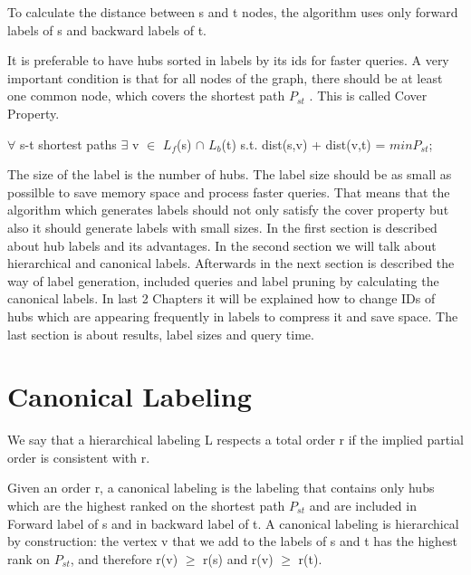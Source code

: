 \documentclass[english,draft]{article}
\begin{document}
To calculate the distance between s and t nodes, the algorithm uses only forward labels of s and backward labels of t. 

It is preferable to have hubs sorted in labels by its ids for faster queries.
A very important condition is that for all nodes of the graph, there should be at least one common node, which covers the shortest path ${P}_{st}$ . This is called Cover Property. 

\begin{center}
			$\forall$ s-t shortest paths 
			$\exists$ v $\in$ ${L}_{f}$(s) $\cap$ ${L}_{b}$(t) 
			  s.t. dist(s,v) + dist(v,t) = $min {P}_{st}$;
\end{center}
The size of the label is the number of hubs. 
The label size should be as small as possilble to save memory space and process faster queries. 
That means that the algorithm which generates labels should not only satisfy the cover property but also it should
generate labels with small sizes.
In the first section is described about hub labels and its advantages. 
In the second section we will talk about hierarchical and canonical labels. 
Afterwards in the next section is described the way of label generation, included queries and label pruning by
calculating the canonical labels. 
In last 2 Chapters it will be explained how to change IDs of hubs which are appearing frequently in labels to compress
it and save space.
The last section is about results, label sizes and query time.

\section{Canonical Labeling}
	We say that a hierarchical labeling L respects a total order r if the implied partial order is consistent with r. 

	Given an order r, a canonical labeling is the labeling that contains only hubs which are the highest ranked on the
		shortest path ${P}_{st}$ and are included in Forward label of s and in backward label of t.
			A canonical labeling is hierarchical by construction: the vertex v that we add to the labels of s and t
			has the 	highest rank on ${P}_{st}$, and therefore r(v) $\geq$ r(s) and r(v) $\geq$ r(t).
\end{document}
